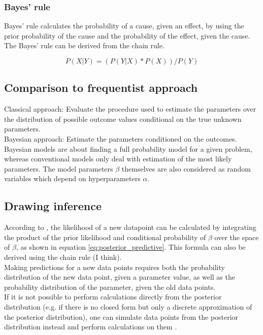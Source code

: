 \documentclass{article}
\begin{document}
\subsubsection{Bayes' rule}

Bayes' rule calculates the probability of a cause, given an effect, by using the prior probability of the cause and the probability of the effect, given the cause. The Bayes' rule can be derived from the chain rule.

\begin{equation}
P(X|Y) = ( P(Y|X) * P(X) ) / P(Y)
\end{equation}

\subsection{Comparison to frequentist approach}

Classical approach: Evaluate the procedure used to estimate the parameters over the distribution of possible outcome values conditional on the true unknown parameters.
\\
Bayesian approach: Estimate the parameters conditioned on the outcomes.
\cite{1439840954}
\\
Bayesian models are about finding a full probability model for a given problem, whereas conventional models only deal with estimation of the most likely parameters.
The model parameters $\beta$ themselves are also considered as random variables which depend on hyperparameters $\alpha$.


\subsection{Drawing inference}
According to \cite{Wang2018}, the likelihood of a new datapoint can be calculated by integrating the product of the prior likelihood and conditional probability of $\beta$ over the space of $\beta$, as shown in equation \ref{eq:posterior_predictive}. This formula can also be derived using the chain rule (I think).
\\
Making predictions for a new data points requires both the probability distribution of the new data point, given a parameter value, as well as the probability distribution of the parameter, given the old data points.
\\
If it is not possible to perform calculations directly from the posterior distribution (e.g. if there is no closed form but only a discrete approximation of the posterior distribution), one can simulate data points from the posterior distribution instead and perform calculations on them \cite{1439840954}.
\end{document}
